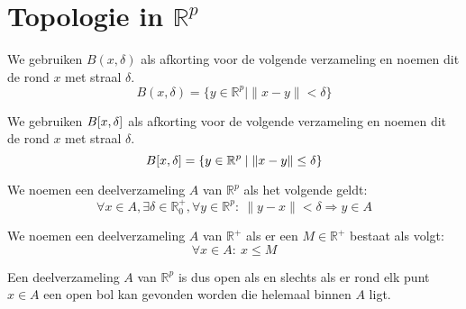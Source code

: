 \documentclass[main.tex]{subfiles}
\begin{document}
\section{Topologie in $\mathbb{R}^p$}
\label{sec:topologie-mathbbrp}

\begin{de}
  We gebruiken $B(x,\delta)$ als afkorting voor de volgende verzameling en noemen dit de  rond $x$ met straal $\delta$.
  \[ B(x,\delta) = \{ y \in \mathbb{R}^{p} \mid \|x-y\| < \delta \} \]
\end{de}

\begin{de}
  We gebruiken $B\interval{x}{\delta}$ als afkorting voor de volgende verzameling en noemen dit de  rond $x$ met straal $\delta$.
  \[ B\interval{x}{\delta} = \{ y \in \mathbb{R}^{p} \mid \|x-y\| \le \delta \} \]
\end{de}

\begin{de}
  We noemen een deelverzameling $A$ van $\mathbb{R}^{p}$  als het volgende geldt:
  \[ \forall x\in A, \exists \delta \in \mathbb{R}_{0}^{+}, \forall y\in \mathbb{R}^{p}:\ \|y-x\| < \delta \Rightarrow y \in A \]
\end{de}

\begin{de}
  We noemen een deelverzameling $A$ van $\mathbb{R}^{+}$  als er een $M \in \mathbb{R}^{+}$ bestaat als volgt:
  \[ \forall x \in A:\ x \le M \]
\end{de}

\begin{opm}
  Een deelverzameling $A$ van $\mathbb{R}^{p}$ is dus open als en slechts als er rond elk punt $x\in A$ een open bol kan gevonden worden die helemaal binnen $A$ ligt.
\end{opm}
\end{document}

